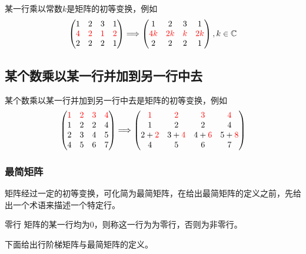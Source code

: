 某一行乘以常数$k$是矩阵的初等变换，例如$$\begin{pmatrix}
	1 & 2 & 3 & 1\\
	\textcolor{red}{4} & \textcolor{red}{2} & \textcolor{red}{1} & \textcolor{red}{2}\\
	2 & 2 & 2 & 1
\end{pmatrix}\Longrightarrow  \begin{pmatrix}
	1 & 2 & 3 & 1\\
	\textcolor{red}{4k} & \textcolor{red}{2k} & \textcolor{red}{k} & \textcolor{red}{2k}\\
	2 & 2 & 2 & 1
\end{pmatrix},k\in \mathbb{C}$$

\subsection{某个数乘以某一行并加到另一行中去}

某个数乘以某一行并加到另一行中去是矩阵的初等变换，例如$$\begin{pmatrix}
	\textcolor{red}{1} & \textcolor{red}{2} & \textcolor{red}{3} & \textcolor{red}{4}\\
	1 & 2 & 2 & 4\\
	2 & 3 & 4 & 5\\
	4 & 5 & 6 & 7
\end{pmatrix}\Longrightarrow  \begin{pmatrix}
	\textcolor{red}{1} & \textcolor{red}{2} & \textcolor{red}{3} & \textcolor{red}{4}\\
	1 & 2 & 2 & 4\\
	2+\textcolor{red}{2} & 3+\textcolor{red}{4} & 4+\textcolor{red}{6} & 5+\textcolor{red}{8}\\
	4 & 5 & 6 & 7
\end{pmatrix}$$

\subsubsection{最简矩阵}

矩阵经过一定的初等变换，可化简为最简矩阵，在给出最简矩阵的定义之前，先给出一个术语来描述一个特定行。

\begin{definition}{零行}
	矩阵的某一行均为0，则称这一行为为零行，否则为非零行。
\end{definition}

下面给出行阶梯矩阵与最简矩阵的定义。

